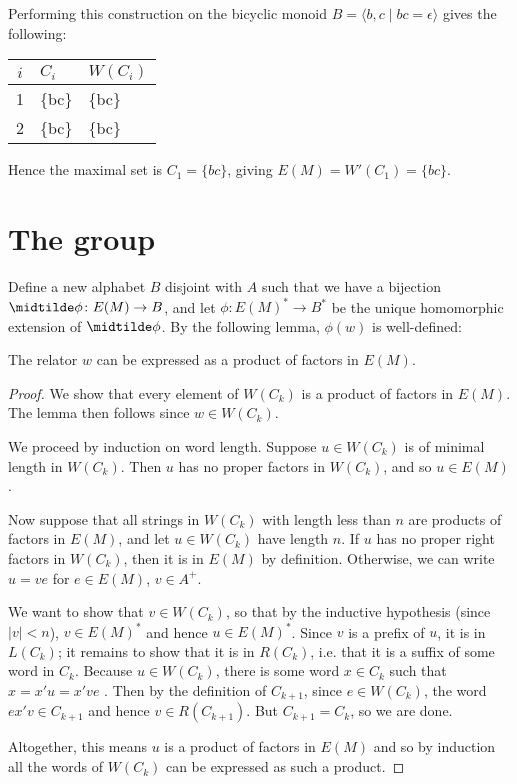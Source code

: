 \documentclass[nosubthm]{lmaths}
\begin{document}
\begin{example}
	Performing this construction on the bicyclic monoid $B = \langle b, c \mid bc = \epsilon \rangle$ gives the following:

	\begin{center}
	\begin{tabular}{c|ll}
		$i$ & $C_i$ & $W(C_i)$ \\
		\hline
		1 & \{bc\} & \{bc\} \\
		2 & \{bc\} & \{bc\}
	\end{tabular}
	\end{center}

	Hence the maximal set is $C_1 = \{bc\}$, giving $E(M) = W'(C_1) = \{ bc \}$.
\end{example}

\section{The group}
Define a new alphabet $B$ disjoint with $A$ such that we have a bijection $\midtilde\phi \colon E(M) \to B$, and let $\phi \colon E(M)^* \to B^*$ be the unique homomorphic extension of $\midtilde\phi$. By the following lemma, $\phi(w)$ is well-defined:

\begin{lemma} \label{lma:relator-factors-E(M)}
	The relator $w$ can be expressed as a product of factors in $E(M)$.
\end{lemma}
\begin{proof}
	\hspace{-0.25mm}We show that every element of $W(C_k)$ is a product of factors in $E(M)$. The lemma then follows since $w \in W(C_k)$.
	
	We proceed by induction on word length. Suppose $u \in W(C_k)$ is of minimal length in $W(C_k)$. Then $u$ has no proper factors in $W(C_k)$, and so $u \in E(M)$.

	Now suppose that all strings in $W(C_k)$ with length less than $n$ are products of factors in $E(M)$, and let $u \in W(C_k)$ have length $n$. If $u$ has no proper right factors in $W(C_k)$, then it is in $E(M)$ by definition. Otherwise, we can write $u = ve$ for $e \in E(M)$, $v \in A^+$.

	We want to show that $v \in W(C_k)$, so that by the inductive hypothesis (since $|v| < n$), $v \in E(M)^*$ and hence $u \in E(M)^*$. Since $v$ is a prefix of $u$, it is in $L(C_k)$; it remains to show that it is in $R(C_k)$, i.e. that it is a suffix of some word in $C_k$. Because $u \in W(C_k)$, there is some word $x \in C_k$ such that $x = x'u = x've$ . Then by the definition of $C_{k+1}$, since $e \in W(C_k)$, the word $ex'v \in C_{k+1}$ and hence $v \in R(C_{k+1})$. But $C_{k+1} = C_k$, so we are done.

	Altogether, this means $u$ is a product of factors in $E(M)$ and so by induction all the words of $W(C_k)$ can be expressed as such a product.
\end{proof}
\end{document}
